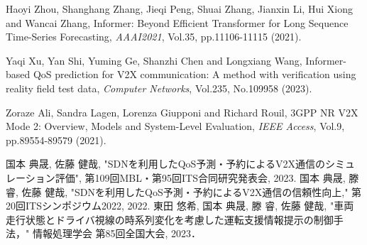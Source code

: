 \documentclass[a4paper,11pt,uplatex]{ujreport}
\begin{document}
\begin{thebibliography}{99}
  Haoyi Zhou, Shanghang Zhang, Jieqi Peng, Shuai Zhang, Jianxin Li, Hui Xiong and Wancai Zhang, Informer: Beyond Efficient Transformer for Long Sequence Time-Series Forecasting, \textit{AAAI2021}, Vol.35, pp.11106-11115 (2021).

  Yaqi Xu, Yan Shi, Yuming Ge, Shanzhi Chen and Longxiang Wang, Informer-based QoS prediction for V2X communication: A method with verification using reality field test data, \textit{Computer Networks}, Vol.235, No.109958 (2023).

  Zoraze Ali, Sandra Lagen, Lorenza Giupponi and Richard Rouil, 3GPP NR V2X Mode 2: Overview, Models and System-Level Evaluation, \textit{IEEE Access}, Vol.9, pp.89554-89579 (2021).

\end{thebibliography}

% 
% 

\label{chap:Bibiliography}

\renewcommand{\bibname}{研究業績}

\begin{thebibliography}{99}
  \bibitem{} 国本 典晟, 佐藤 健哉, "SDNを利用したQoS予測・予約によるV2X通信のシミュレーション評価", 第109回MBL・第95回ITS合同研究発表会, 2023.
  \bibitem{} 国本 典晟, 滕 睿, 佐藤 健哉, "SDNを利用したQoS予測・予約によるV2X通信の信頼性向上," 第20回ITSシンポジウム2022, 2022.
  \bibitem{} 東田 悠希, 国本 典晟, 滕 睿, 佐藤 健哉, "車両走行状態とドライバ視線の時系列変化を考慮した運転支援情報提示の制御手法，" 情報処理学会 第85回全国大会, 2023．
\end{thebibliography}

\label{chap:Publications}

\end{document}
